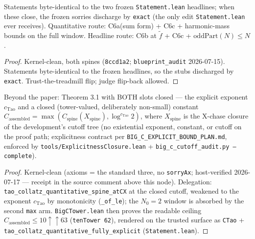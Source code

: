 \begin{theorem}\label{C6s}
  \leanok
Statements byte-identical to the two frozen \texttt{Statement.lean} headlines; when these
close, the frozen sorries discharge by \texttt{exact} (the only edit
\texttt{Statement.lean} ever receives).  Quantitative route: C6a(sum form) + C6c +
harmonic-mass bounds on the full window.  Headline route: C6b at \(\tilde f\) + C6c +
\(\mathrm{oddPart}(N)\le N\).
\end{theorem}
\begin{proof}
  \leanok
  Kernel-clean, both spines (\texttt{8ccd1a2}; \texttt{blueprint\_audit} 2026-07-15).
  Statements byte-identical to the frozen headlines, so the stubs discharged by
  \texttt{exact}.  Trust-the-treadmill flip; judge flip-back allowed.
\end{proof}

\begin{theorem}\label{C6x}
  \leanok
Beyond the paper: Theorem 3.1 with BOTH slots closed --- the explicit exponent
\(c_{\mathrm{Tao}}\) and a closed (tower-valued, deliberately non-small) constant
\(C_{\mathrm{assembled}} = \max(C_{\mathrm{spine}}(X_{\mathrm{spine}}),
\log^{c_{\mathrm{Tao}}}2)\), where \(X_{\mathrm{spine}}\) is the X-chase closure of the
development's cutoff tree (no existential exponent, constant, or cutoff on the proof
path; explicitness contract per \texttt{BIG\_C\_EXPLICIT\_BOUND\_PLAN.md}, enforced by
\texttt{tools/ExplicitnessClosure.lean} + \texttt{big\_c\_cutoff\_audit.py --complete}).
\end{theorem}
\begin{proof}
  \leanok
  Kernel-clean (axioms = the standard three, no \texttt{sorryAx}; host-verified
  2026-07-17 — receipt in the source comment above this node).  Delegation:
  \texttt{tao\_collatz\_quantitative\_spine\_atCX} at the closed cutoff, weakened to the
  exponent \(c_{\mathrm{Tao}}\) by monotonicity (\texttt{\_of\_le}); the \(N_0 = 2\)
  window is absorbed by the second \texttt{max} arm.  \texttt{BigCTower.lean} then proves
  the readable ceiling \(C_{\mathrm{assembled}} \le 10\uparrow\uparrow 63\)
  (\texttt{tenTower 62}), rendered on the trusted surface as \texttt{CTao} +
  \texttt{tao\_collatz\_quantitative\_fully\_explicit} (\texttt{Statement.lean}).
\end{proof}

